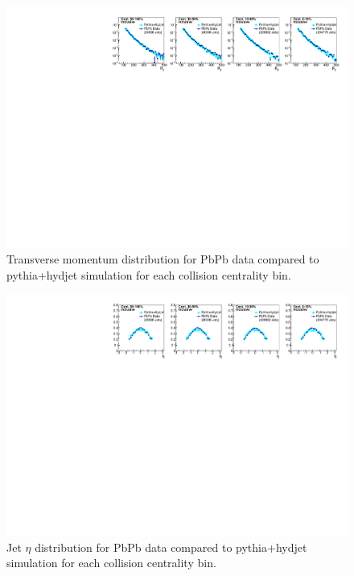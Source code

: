  
  \begin{figure}[h!]
 \begin{center}
 \includegraphics[width=1\textwidth]{figures/Appendices/JetKinematics_PbPb_Hydjet.pdf}
 \caption{Transverse momentum distribution for PbPb data compared to {\sc pythia+hydjet} simulation for each collision centrality bin.}
 \label{fig:PbPbJetPt2} 
 \end{center}
 \end{figure}

  \begin{figure}[h!]
 \begin{center}
 \includegraphics[width=1\textwidth]{figures/Appendices/JetEta_PbPb_Hydjet.pdf}
 \caption{Jet $\eta$ distribution for PbPb data compared to {\sc pythia+hydjet} simulation for each collision centrality bin.}
 \label{fig:PbPbJetEta2} 
 \end{center}
 \end{figure}

